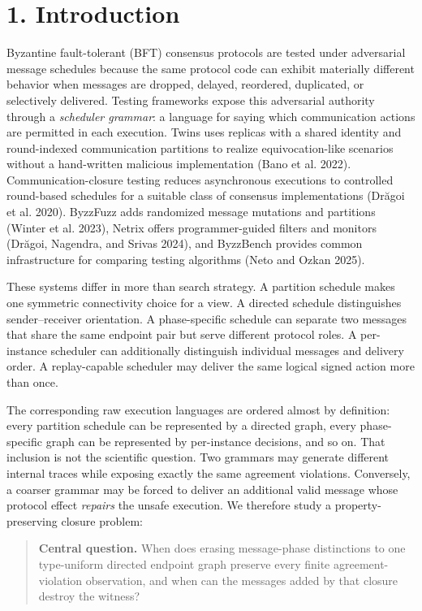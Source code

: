\documentclass[10pt,a4paper]{article}
\begin{document}
\section{1. Introduction}\label{introduction}

Byzantine fault-tolerant (BFT) consensus protocols are tested under
adversarial message schedules because the same protocol code can exhibit
materially different behavior when messages are dropped, delayed,
reordered, duplicated, or selectively delivered. Testing frameworks
expose this adversarial authority through a \emph{scheduler grammar}: a
language for saying which communication actions are permitted in each
execution. Twins uses replicas with a shared identity and round-indexed
communication partitions to realize equivocation-like scenarios without
a hand-written malicious implementation (Bano et al. 2022).
Communication-closure testing reduces asynchronous executions to
controlled round-based schedules for a suitable class of consensus
implementations (Drăgoi et al. 2020). ByzzFuzz adds randomized message
mutations and partitions (Winter et al. 2023), Netrix offers
programmer-guided filters and monitors (Drăgoi, Nagendra, and Srivas
2024), and ByzzBench provides common infrastructure for comparing
testing algorithms (Neto and Ozkan 2025).

These systems differ in more than search strategy. A partition schedule
makes one symmetric connectivity choice for a view. A directed schedule
distinguishes sender--receiver orientation. A phase-specific schedule
can separate two messages that share the same endpoint pair but serve
different protocol roles. A per-instance scheduler can additionally
distinguish individual messages and delivery order. A replay-capable
scheduler may deliver the same logical signed action more than once.

The corresponding raw execution languages are ordered almost by
definition: every partition schedule can be represented by a directed
graph, every phase-specific graph can be represented by per-instance
decisions, and so on. That inclusion is not the scientific question. Two
grammars may generate different internal traces while exposing exactly
the same agreement violations. Conversely, a coarser grammar may be
forced to deliver an additional valid message whose protocol effect
\emph{repairs} the unsafe execution. We therefore study a
property-preserving closure problem:

\begin{quote}
\textbf{Central question.} When does erasing message-phase distinctions
to one type-uniform directed endpoint graph preserve every finite
agreement-violation observation, and when can the messages added by that
closure destroy the witness?
\end{quote}
\end{document}
